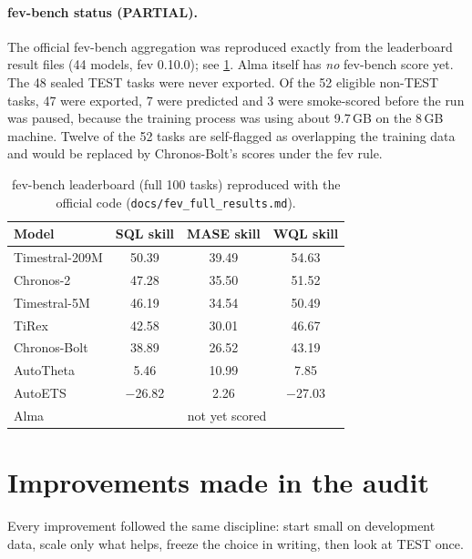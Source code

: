 \documentclass[10pt,a4paper]{article}
\newcommand{\src}[1]{{\footnotesize\texttt{#1}}}
\begin{document}
\paragraph{fev-bench status (PARTIAL).} The official fev-bench aggregation was reproduced exactly from the leaderboard result files (44 models, fev 0.10.0); see \cref{tab:fev}. Alma itself has \emph{no} fev-bench score yet. The 48 sealed TEST tasks were never exported. Of the 52 eligible non-TEST tasks, 47 were exported, 7 were predicted and 3 were smoke-scored before the run was paused, because the training process was using about 9.7\,GB on the 8\,GB machine. Twelve of the 52 tasks are self-flagged as overlapping the training data and would be replaced by Chronos-Bolt's scores under the fev rule.

\begin{table}[H]
\centering\small
\caption{fev-bench leaderboard (full 100 tasks) reproduced with the official code (\src{docs/fev\_full\_results.md}).}
\label{tab:fev}
\begin{tabular}{@{}lccc@{}}
\toprule
Model & SQL skill & MASE skill & WQL skill\\
\midrule
Timestral-209M & 50.39 & 39.49 & 54.63\\
Chronos-2 & 47.28 & 35.50 & 51.52\\
Timestral-5M & 46.19 & 34.54 & 50.49\\
TiRex & 42.58 & 30.01 & 46.67\\
Chronos-Bolt & 38.89 & 26.52 & 43.19\\
AutoTheta & 5.46 & 10.99 & 7.85\\
AutoETS & $-$26.82 & 2.26 & $-$27.03\\
Alma & \multicolumn{3}{c}{not yet scored}\\
\bottomrule
\end{tabular}
\end{table}

\section{Improvements made in the audit}
\label{sec:improve}

Every improvement followed the same discipline: start small on development data, scale only what helps, freeze the choice in writing, then look at TEST once.
\end{document}

